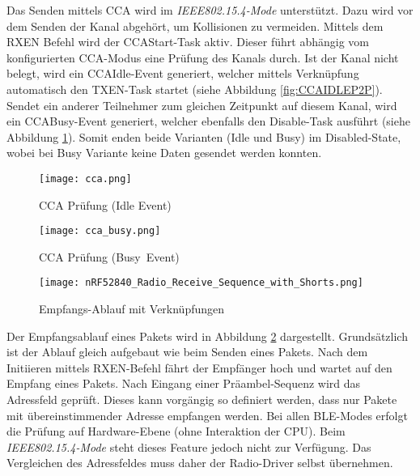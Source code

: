 Das Senden mittels CCA wird im \textit{IEEE802.15.4-Mode} unterstützt.
Dazu wird vor dem Senden der Kanal abgehört, um Kollisionen zu vermeiden.
Mittels dem RXEN Befehl wird der CCAStart-Task aktiv. Dieser führt abhängig vom konfigurierten CCA-Modus eine Prüfung des Kanals durch.
Ist der Kanal nicht belegt, wird ein CCAIdle-Event generiert, welcher mittels Verknüpfung automatisch den TXEN-Task startet (siehe Abbildung \ref{fig:CCAIDLEP2P}).
Sendet ein anderer Teilnehmer zum gleichen Zeitpunkt auf diesem Kanal, wird ein CCABusy-Event generiert, welcher ebenfalls den Disable-Task ausführt (siehe Abbildung \ref{fig:CCABUSYP2P}).
Somit enden beide Varianten (Idle und Busy) im Disabled-State, wobei bei Busy Variante keine Daten gesendet werden konnten. \cite{nordic_semi_nrf_infocenter_radio_transmit_sequence_2020}

\begin{figure}[!htbp]
\begin{adjustbox}{width=1\textwidth}
	\begin{minipage}[b]{0.5\textwidth}
		\centering
		\texttt{[image: cca.png]}
		\caption[Sende-Ablauf mit CCA Idle]{CCA Prüfung (Idle Event)\cite{nordic_semi_nrf_infocenter_radio_ieee_operation_2020}}
		\label{fig:CCAIDLEP2P}
	\end{minipage}
	\begin{minipage}[b]{0.5\textwidth}
		\centering
		\texttt{[image: cca\_busy.png]}
		\caption[Sende-Ablauf mit CCA Busy]{CCA Prüfung (Busy~Event)\cite{nordic_semi_nrf_infocenter_radio_ieee_operation_2020}}
		\label{fig:CCABUSYP2P}
	\end{minipage}
\end{adjustbox}
\end{figure}

\begin{figure} [H]
	\centering
	\texttt{[image: nRF52840\_Radio\_Receive\_Sequence\_with\_Shorts.png]}
	\caption{Empfangs-Ablauf mit Verknüpfungen \cite{nordic_semi_nrf_infocenter_radio_receive_sequence_2020}}
	\label{fig:RadioReceiveSequP2P}
\end{figure}


Der Empfangsablauf eines Pakets wird in Abbildung \ref{fig:RadioReceiveSequP2P} dargestellt. Grundsätzlich ist der Ablauf gleich aufgebaut wie beim Senden eines Pakets. Nach dem Initiieren mittels RXEN-Befehl fährt der Empfänger hoch und wartet auf den Empfang eines Pakets. Nach Eingang einer Präambel-Sequenz wird das Adressfeld geprüft.
Dieses kann vorgängig so definiert werden, dass nur Pakete mit übereinstimmender Adresse empfangen werden.
Bei allen BLE-Modes erfolgt die Prüfung auf Hardware-Ebene (ohne Interaktion der CPU).
Beim \textit{IEEE802.15.4-Mode} steht dieses Feature jedoch nicht zur Verfügung. Das Vergleichen des Adressfeldes muss daher der Radio-Driver selbst übernehmen.

